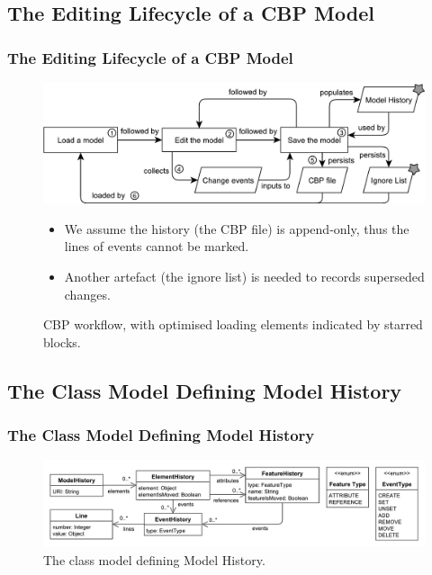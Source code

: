 \documentclass{beamer}
\begin{document}
\begin{frame}
\section{The Editing Lifecycle of a CBP Model}
\frametitle{The Editing Lifecycle of a CBP Model}
\begin{figure}[ht]
    \centering
    \includegraphics[width=\linewidth]{flowchart}
    \caption{CBP workflow, with optimised loading elements indicated by starred blocks.}
    \label{fig:flowchart}
    \begin{itemize}
        \item We assume the history (the CBP file) is append-only, thus the lines of events cannot be marked. 
        \item Another artefact (the ignore list) is needed to records superseded changes.
    \end{itemize}
\end{figure}
\end{frame}

\begin{frame}
\section{The Class Model Defining Model History}
\frametitle{The Class Model Defining Model History}
\begin{figure}[ht]
    \centering
    \includegraphics[width=\linewidth]{object_history}
    \caption{The class model defining Model History.}
    \label{fig:object_history}
\end{figure}
\end{frame}
\end{document}
